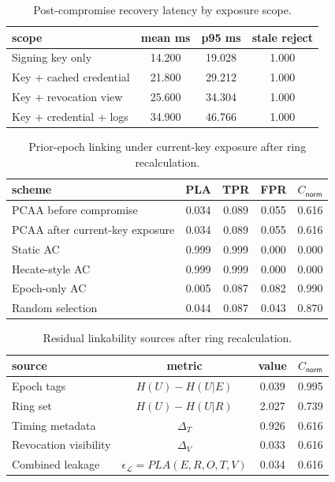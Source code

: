 \begin{table}[t]
\centering
\caption{Post-compromise recovery latency by exposure scope.}
\label{tab:recovery}
\begin{tabular}{@{}lccc@{}}
\toprule
scope & mean ms & p95 ms & stale reject \\
\midrule
Signing key only & 14.200 & 19.028 & 1.000 \\
Key + cached credential & 21.800 & 29.212 & 1.000 \\
Key + revocation view & 25.600 & 34.304 & 1.000 \\
Key + credential + logs & 34.900 & 46.766 & 1.000 \\
\bottomrule
\end{tabular}
\end{table}

\begin{table}[t]
\centering
\caption{Prior-epoch linking under current-key exposure after ring recalculation.}
\label{tab:unlinkability-current-key}
\begin{tabular}{@{}lcccc@{}}
\toprule
scheme & PLA & TPR & FPR & $C_{\mathsf{norm}}$ \\
\midrule
PCAA before compromise & 0.034 & 0.089 & 0.055 & 0.616 \\
PCAA after current-key exposure & 0.034 & 0.089 & 0.055 & 0.616 \\
Static AC & 0.999 & 0.999 & 0.000 & 0.000 \\
Hecate-style AC & 0.999 & 0.999 & 0.000 & 0.000 \\
Epoch-only AC & 0.005 & 0.087 & 0.082 & 0.990 \\
Random selection & 0.044 & 0.087 & 0.043 & 0.870 \\
\bottomrule
\end{tabular}
\end{table}

\begin{table}[t]
\centering
\caption{Residual linkability sources after ring recalculation.}
\label{tab:residual-sources}
\begin{tabular}{@{}lccc@{}}
\toprule
source & metric & value & $C_{\mathsf{norm}}$ \\
\midrule
Epoch tags & $H(U)-H(U|E)$ & 0.039 & 0.995 \\
Ring set & $H(U)-H(U|R)$ & 2.027 & 0.739 \\
Timing metadata & $\Delta_T$ & 0.926 & 0.616 \\
Revocation visibility & $\Delta_V$ & 0.033 & 0.616 \\
Combined leakage & $\epsilon_{\mathcal{L}}=PLA(E,R,O,T,V)$ & 0.034 & 0.616 \\
\bottomrule
\end{tabular}
\end{table}

